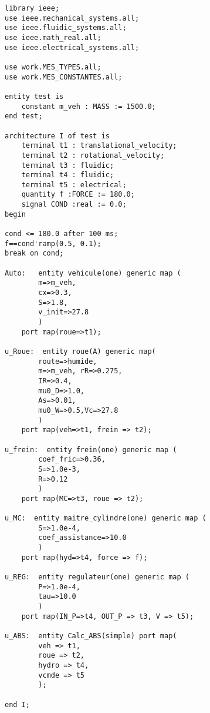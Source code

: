 \begin{verbatim}
library ieee;
use ieee.mechanical_systems.all;
use ieee.fluidic_systems.all;
use ieee.math_real.all;
use ieee.electrical_systems.all;

use work.MES_TYPES.all;
use work.MES_CONSTANTES.all;

entity test is
    constant m_veh : MASS := 1500.0;
end test;

architecture I of test is 
    terminal t1 : translational_velocity;
    terminal t2 : rotational_velocity;
    terminal t3 : fluidic;
    terminal t4 : fluidic; 
    terminal t5 : electrical; 
    quantity f :FORCE := 180.0;
    signal COND :real := 0.0;
begin 

cond <= 180.0 after 100 ms;
f==cond'ramp(0.5, 0.1);
break on cond;

Auto: 	entity vehicule(one) generic map (
        m=>m_veh,
        cx=>0.3,
        S=>1.8,
        v_init=>27.8
        ) 
    port map(roue=>t1);

u_Roue:  entity roue(A) generic map(
        route=>humide,
        m=>m_veh, rR=>0.275,
        IR=>0.4,
        mu0_D=>1.0,
        As=>0.01,
        mu0_W=>0.5,Vc=>27.8
        )
    port map(veh=>t1, frein => t2);

u_frein:  entity frein(one) generic map (
        coef_fric=>0.36,
        S=>1.0e-3,
        R=>0.12
        )
    port map(MC=>t3, roue => t2);

u_MC:  entity maitre_cylindre(one) generic map (
        S=>1.0e-4,
        coef_assistance=>10.0
        )
    port map(hyd=>t4, force => f);

u_REG:  entity regulateur(one) generic map (
        P=>1.0e-4,
        tau=>10.0
        )
    port map(IN_P=>t4, OUT_P => t3, V => t5);

u_ABS:  entity Calc_ABS(simple) port map(
        veh => t1,
        roue => t2,
        hydro => t4,
        vcmde => t5
        );

end I; 
\end{verbatim}